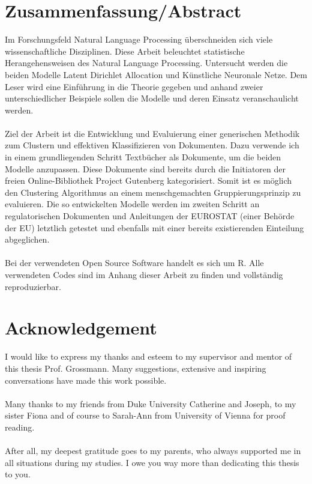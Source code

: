 \documentclass[11pt,a4paper]{article}
\author{Sebastian Knigge}
\begin{document}
	
\section*{Zusammenfassung/Abstract}
	
Im Forschungsfeld Natural Language Processing überschneiden sich viele wissenschaftliche Disziplinen. Diese Arbeit beleuchtet statistische Herangehensweisen des Natural Language Processing. Untersucht werden die beiden Modelle Latent Dirichlet Allocation und Künstliche Neuronale Netze. Dem Leser wird eine Einführung in die Theorie gegeben und anhand zweier unterschiedlicher Beispiele sollen die Modelle und deren Einsatz veranschaulicht werden. \\
\ \\
Ziel der Arbeit ist die Entwicklung und Evaluierung einer generischen Methodik zum Clustern und effektiven Klassifizieren von Dokumenten. Dazu verwende ich in einem grundliegenden Schritt Textbücher als Dokumente, um die beiden Modelle anzupassen. Diese Dokumente sind bereits durch die Initiatoren der freien Online-Bibliothek Project Gutenberg kategorisiert. Somit ist es möglich den Clustering Algorithmus an einem menschgemachten Gruppierungsprinzip zu evaluieren. Die so entwickelten Modelle werden im zweiten Schritt an regulatorischen Dokumenten und Anleitungen der EUROSTAT (einer Behörde der EU) letztlich getestet und ebenfalls mit einer bereits existierenden Einteilung abgeglichen. \\
\ \\
Bei der verwendeten Open Source Software handelt es sich um R. Alle verwendeten Codes sind im Anhang dieser Arbeit zu finden und vollständig reproduzierbar.


	
\section*{Acknowledgement}

I would like to express my thanks and esteem to my supervisor and mentor of this thesis Prof. Grossmann. Many suggestions, extensive and inspiring conversations have made this work possible.\\
\ \\
Many thanks to my friends from Duke University Catherine and Joseph, to my sister Fiona and of course to Sarah-Ann from University of Vienna for proof reading.\\
\ \\
After all, my deepest gratitude goes to my parents, who always supported me in all situations during my studies. I owe you way more than dedicating this thesis to you.
\end{document}
